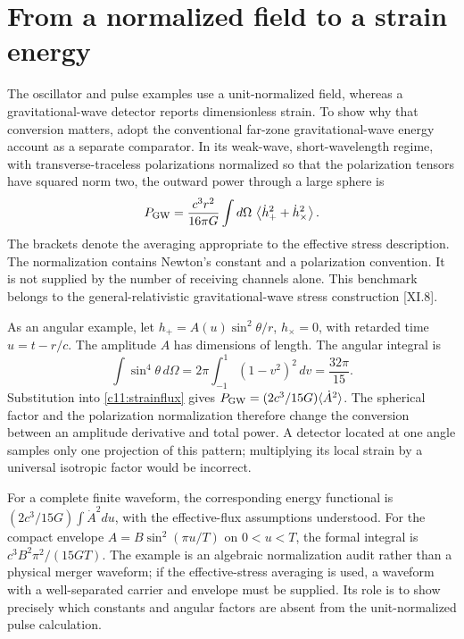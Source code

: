 \section{From a normalized field to a strain energy}
The oscillator and pulse examples use a unit-normalized field, whereas a gravitational-wave detector reports dimensionless strain. To show why that conversion matters, adopt the conventional far-zone gravitational-wave energy account as a separate comparator. In its weak-wave, short-wavelength regime, with transverse-traceless polarizations normalized so that the polarization tensors have squared norm two, the outward power through a large sphere is
\begin{equation}
 P_{\rm GW}=\frac{c^3r^2}{16\pi G}
 \int d\Omega\,\left\langle\dot h_+^2+\dot h_\times^2\right\rangle.
 \label{c11:strainflux}
\end{equation}
The brackets denote the averaging appropriate to the effective stress description. The normalization contains Newton's constant and a polarization convention. It is not supplied by the number of receiving channels alone. This benchmark belongs to the general-relativistic gravitational-wave stress construction [XI.8].

As an angular example, let $h_+=A(u)\sin^2\theta/r$, $h_\times=0$, with retarded time $u=t-r/c$. The amplitude $A$ has dimensions of length. The angular integral is
\begin{equation}
 \int\sin^4\theta\,d\Omega
 =2\pi\int_{-1}^{1}(1-v^2)^2\,dv
 =\frac{32\pi}{15}.
 \label{c11:angularintegral}
\end{equation}
Substitution into \eqref{c11:strainflux} gives $P_{\rm GW}=(2c^3/15G)\langle\dot A^2\rangle$. The spherical factor and the polarization normalization therefore change the conversion between an amplitude derivative and total power. A detector located at one angle samples only one projection of this pattern; multiplying its local strain by a universal isotropic factor would be incorrect.

For a complete finite waveform, the corresponding energy functional is $(2c^3/15G)\int\dot A^2du$, with the effective-flux assumptions understood. For the compact envelope $A=B\sin^2(\pi u/T)$ on $0<u<T$, the formal integral is $c^3B^2\pi^2/(15GT)$. The example is an algebraic normalization audit rather than a physical merger waveform; if the effective-stress averaging is used, a waveform with a well-separated carrier and envelope must be supplied. Its role is to show precisely which constants and angular factors are absent from the unit-normalized pulse calculation.

